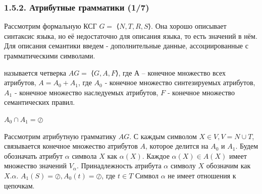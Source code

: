     \begin{frame}
        \frametitle{1.5.2. Атрибутные грамматики (1/7)}
        Рассмотрим формальную КСГ $G =$ ⟨$N, T, R, S$⟩. Она хорошо описывает 
        синтаксис языка, но её недостаточно для описания  языка, 
        то есть значений в нём. Для описания семантики введем  - дополнительные данные, ассоциированные с грамматическими символами.
        
         называется четверка $AG =$ ⟨$G, A, F$⟩, где $А$ – конечное множество всех атрибутов, $A = A_0 + A_1$, 
        где $A_0$ ‐ конечное множество синтезируемых атрибутов, $A_1$ ‐ конечное множество наследуемых атрибутов,  $F$ ‐ конечное множество семантических правил. 
        
        
        \remark $A_0 \cap A_1 = \oslash$ 
        
        Рассмотрим атрибутную грамматику $AG$. С каждым символом $X \in V, V = 
        N \cup T$, связывается конечное множество атрибутов $A$, которое делится на 
        $A_0$ и $A_1$.  Будем обозначать атрибут $\alpha$ символа $X$ как $\alpha(X)$. Каждое $\alpha(X) \in A(X)$ имеет множество значений $V_\alpha$. Принадлежность атрибута $\alpha$ символу $X$ обозначим как $X.\alpha$.
        \remark  $A_1(S) = \oslash, A_0(t) = \oslash$, где $t \in T$
        \remark Символ $\alpha$ не имеет отношения к цепочкам.
    \end{frame}


